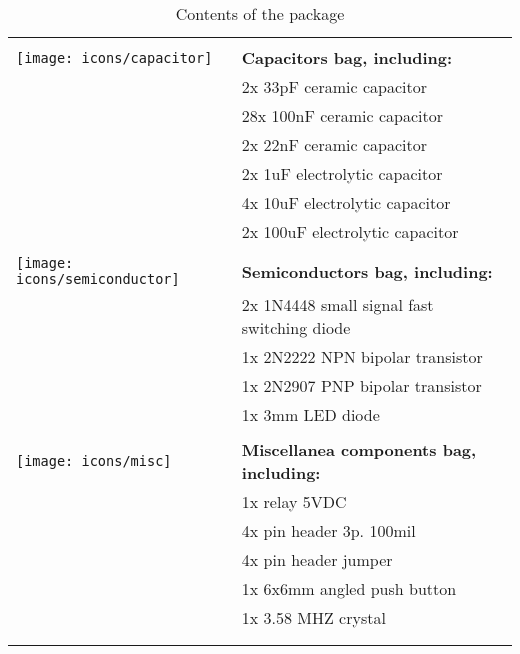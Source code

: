 \begin{longtable}{m{10mm}|l}
	                                      &                                                             \\
	\texttt{[image: icons/capacitor]}     & {\bf Capacitors bag, including:}                            \\
	                                      & 2x 33pF ceramic capacitor                                   \\
	                                      & 28x 100nF ceramic capacitor                                 \\
	                                      & 2x 22nF ceramic capacitor                                   \\
	                                      & 2x 1uF electrolytic capacitor                               \\
	                                      & 4x 10uF electrolytic capacitor                              \\
	                                      & 2x 100uF electrolytic capacitor                             \\
	                                      &                                                             \\
	\texttt{[image: icons/semiconductor]} & {\bf Semiconductors bag, including:}                        \\
	                                      & 2x 1N4448 small signal fast switching diode                 \\
	                                      & 1x 2N2222 NPN bipolar transistor                            \\
	                                      & 1x 2N2907 PNP bipolar transistor                            \\
	                                      & 1x 3mm LED diode                                            \\
	                                      &                                                             \\
	\texttt{[image: icons/misc]}          & {\bf Miscellanea components bag, including:}                \\
	                                      & 1x relay 5VDC                                               \\
	                                      & 4x pin header 3p. 100mil                                    \\
	                                      & 4x pin header jumper                                        \\
	                                      & 1x 6x6mm angled push button                                 \\
	                                      & 1x 3.58 MHZ crystal                                         \\
	                                      &                                                             \\
	\caption{Contents of the package}
	\label{table:package-contents}
\end{longtable}

